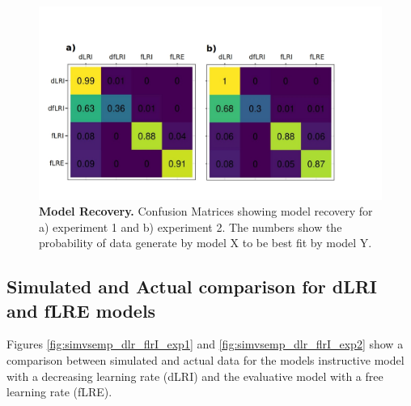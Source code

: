 \documentclass[a4paper,12pt]{article}
\begin{document}
\begin{figure}[ht!]
\centerline
{\includegraphics[width=1\textwidth]{figures/ModelRecovery.jpg}}
\caption{\textbf{Model Recovery.} Confusion Matrices showing model recovery for a) experiment 1 and b) experiment 2. The numbers show the probability of data generate by model X to be best fit by model Y.}
\label{fig:model_recovery}
\end{figure}

\subsection*{Simulated and Actual comparison for dLRI and fLRE models}
Figures \ref{fig:simvsemp_dlr_flrI_exp1} and \ref{fig:simvsemp_dlr_flrI_exp2} show a comparison between simulated and actual data for the models instructive model with a decreasing learning rate (dLRI) and the evaluative model with a free learning rate (fLRE).

 
\end{document}
